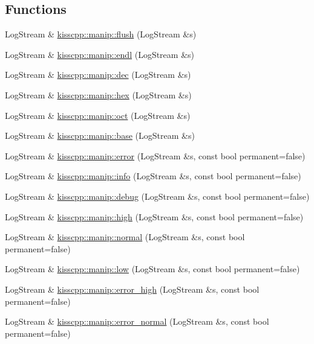 \subsection*{Functions}
\begin{DoxyCompactItemize}
\item 
Log\-Stream \& \hyperlink{a00090_a416806b7a937a2437ffadb9b523e1cf3}{kisscpp\-::manip\-::flush} (Log\-Stream \&s)
\item 
Log\-Stream \& \hyperlink{a00090_ad682f16cb474bc7ff2c991ad2c45db66}{kisscpp\-::manip\-::endl} (Log\-Stream \&s)
\item 
Log\-Stream \& \hyperlink{a00090_a5d7a175caf56eafe6f39469a0b0ac034}{kisscpp\-::manip\-::dec} (Log\-Stream \&s)
\item 
Log\-Stream \& \hyperlink{a00090_a1463e1f81c1a4a6c6e19e883f1160059}{kisscpp\-::manip\-::hex} (Log\-Stream \&s)
\item 
Log\-Stream \& \hyperlink{a00090_a1d9bd6b119890c9396e1dce048c07032}{kisscpp\-::manip\-::oct} (Log\-Stream \&s)
\item 
Log\-Stream \& \hyperlink{a00090_a3a365ff3909fcd0d76c2f7fa4da3b2b0}{kisscpp\-::manip\-::base} (Log\-Stream \&s)
\item 
Log\-Stream \& \hyperlink{a00090_a53df3ad3d908fa67b2d4a73000241b4f}{kisscpp\-::manip\-::error} (Log\-Stream \&s, const bool permanent=false)
\item 
Log\-Stream \& \hyperlink{a00090_aff72768a5e8b0486de0cecb0bd95f3e4}{kisscpp\-::manip\-::info} (Log\-Stream \&s, const bool permanent=false)
\item 
Log\-Stream \& \hyperlink{a00090_a795be5b59b6a02e1d8f6d9d5bb41c3a4}{kisscpp\-::manip\-::debug} (Log\-Stream \&s, const bool permanent=false)
\item 
Log\-Stream \& \hyperlink{a00090_a210331dfe6a9773c4e8e1db1e889820b}{kisscpp\-::manip\-::high} (Log\-Stream \&s, const bool permanent=false)
\item 
Log\-Stream \& \hyperlink{a00090_a8f9aa3f28fd54225dee006e014efcf65}{kisscpp\-::manip\-::normal} (Log\-Stream \&s, const bool permanent=false)
\item 
Log\-Stream \& \hyperlink{a00090_a934867d04be842b8f6e9df5dfa07f40e}{kisscpp\-::manip\-::low} (Log\-Stream \&s, const bool permanent=false)
\item 
Log\-Stream \& \hyperlink{a00090_aee969aa657dcd750d102fc48a29ba516}{kisscpp\-::manip\-::error\-\_\-high} (Log\-Stream \&s, const bool permanent=false)
\item 
Log\-Stream \& \hyperlink{a00090_af7d168675689cf70931df8d3acb4b4e9}{kisscpp\-::manip\-::error\-\_\-normal} (Log\-Stream \&s, const bool permanent=false)

\end{DoxyCompactItemize}
